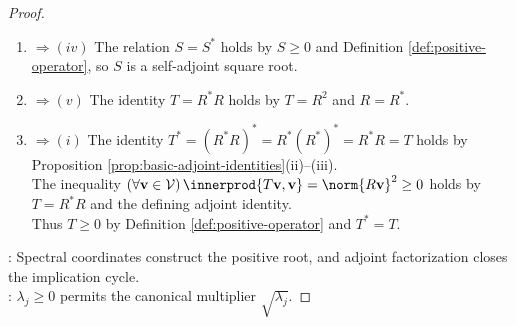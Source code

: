 \begin{theorem}
\begin{proof}
\begin{enumerate}[label=(\roman*)]
$S=S^*$ by the preceding adjoint identity, and $\innerprod{S\mathbf{v},\mathbf{v}}=\sum\limits_{j=1}^{n}\sqrt{\lambda_j}\abs{d_j}^2\geq0$. Hence $S\geq0$ by Definition \ref{def:positive-operator}.\\
The identity $S^2=T$ holds by Proposition \ref{prop:linear-map-determined-by-basis} and the equality $(\forall j\in\{1,\ldots,n\})\,S^2\mathbf{e}_j=T\mathbf{e}_j$.
\item[$(iii)$] $\Rightarrow (iv)$ The relation $S=S^*$ holds by $S\geq0$ and Definition \ref{def:positive-operator}, so $S$ is a self-adjoint square root.
\item[$(iv)$] $\Rightarrow (v)$ The identity $T=R^*R$ holds by $T=R^2$ and $R=R^*$.
\item[$(v)$] $\Rightarrow (i)$ The identity $T^*=(R^*R)^*=R^*(R^*)^*=R^*R=T$ holds by Proposition \ref{prop:basic-adjoint-identities}(ii)--(iii).\\
The inequality $(\forall\mathbf{v}\in\mathcal{V})\,\innerprod{T\mathbf{v},\mathbf{v}}=\norm{R\mathbf{v}}^2\geq0$ holds by $T=R^*R$ and the defining adjoint identity.\\
Thus $T\geq0$ by Definition \ref{def:positive-operator} and $T^*=T$.
\end{enumerate}
: Spectral coordinates construct the positive root, and adjoint factorization closes the implication cycle.\\
: $\lambda_j\geq0$ permits the canonical multiplier $\sqrt{\lambda_j}$.
\end{proof}
\end{theorem}

